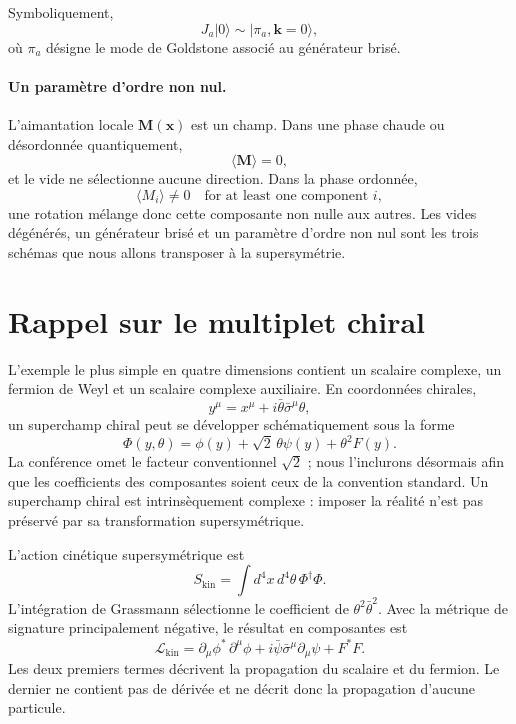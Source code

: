 Symboliquement,
\begin{equation}
J_a|0\rangle
\sim
|\pi_a,\mathbf k=0\rangle,
\label{eq:l9-generator-goldstone}
\end{equation}
où \(\pi_a\) désigne le mode de Goldstone associé au générateur brisé.

\paragraph{Un paramètre d’ordre non nul.}
L’aimantation locale \(\mathbf M(\mathbf x)\) est un champ. Dans une phase chaude ou désordonnée quantiquement,
\begin{equation}
\langle\mathbf M\rangle=0,
\end{equation}
et le vide ne sélectionne aucune direction. Dans la phase ordonnée,
\begin{equation}
\langle M_i\rangle\neq0
\quad\text{for at least one component }i,
\label{eq:l9-magnetization-order}
\end{equation}
une rotation mélange donc cette composante non nulle aux autres. Les vides dégénérés, un générateur brisé et un paramètre d’ordre non nul sont les trois schémas que nous allons transposer à la supersymétrie.

\section{Rappel sur le multiplet chiral}

L’exemple le plus simple en quatre dimensions contient un scalaire complexe, un fermion de Weyl et un scalaire complexe auxiliaire. En coordonnées chirales,
\begin{equation}
y^\mu=x^\mu+i\bar\theta\bar\sigma^\mu\theta,
\end{equation}
un superchamp chiral peut se développer schématiquement sous la forme
\begin{equation}
\Phi(y,\theta)=
\phi(y)+\sqrt2\,\theta\psi(y)+\theta^2F(y).
\label{eq:l9-chiral-expansion}
\end{equation}
La conférence omet le facteur conventionnel \(\sqrt2\) ; nous l’inclurons désormais afin que les coefficients des composantes soient ceux de la convention standard. Un superchamp chiral est intrinsèquement complexe : imposer la réalité n’est pas préservé par sa transformation supersymétrique.

L’action cinétique supersymétrique est
\begin{equation}
S_{\mathrm{kin}}
=
\int d^4x\,d^4\theta\,
\Phi^\dagger\Phi.
\label{eq:l9-kahler-action}
\end{equation}
L’intégration de Grassmann sélectionne le coefficient de
\(\theta^2\bar\theta^2\). Avec la métrique de signature principalement négative, le résultat en composantes est
\begin{equation}
\mathcal L_{\mathrm{kin}}
=
\partial_\mu\phi^\ast\,\partial^\mu\phi
+i\bar\psi\bar\sigma^\mu\partial_\mu\psi
+F^\ast F.
\label{eq:l9-chiral-kinetic}
\end{equation}
Les deux premiers termes décrivent la propagation du scalaire et du fermion. Le dernier ne contient pas de dérivée et ne décrit donc la propagation d’aucune particule.

